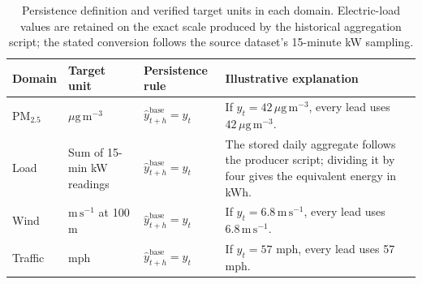 \begin{table}[htbp]
\centering
\footnotesize
\setlength{\tabcolsep}{4pt}
\renewcommand{\arraystretch}{1.18}
\begin{tabularx}{\textwidth}{@{}p{1.45cm} p{2.55cm} p{3.2cm} X@{}}
\toprule
\textbf{Domain} & \textbf{Target unit} & \textbf{Persistence rule} & \textbf{Illustrative explanation} \\
\midrule
PM$_{2.5}$ & $\mu\mathrm{g}\,\mathrm{m}^{-3}$ & $\hat y_{t+h}^{\mathrm{base}}=y_t$ & If $y_t=42\,\mu\mathrm{g}\,\mathrm{m}^{-3}$, every lead uses $42\,\mu\mathrm{g}\,\mathrm{m}^{-3}$. \\
Load & Sum of 15-min kW readings & $\hat y_{t+h}^{\mathrm{base}}=y_t$ & The stored daily aggregate follows the producer script; dividing it by four gives the equivalent energy in kWh. \\
Wind & $\mathrm{m}\,\mathrm{s}^{-1}$ at 100 m & $\hat y_{t+h}^{\mathrm{base}}=y_t$ & If $y_t=6.8\,\mathrm{m}\,\mathrm{s}^{-1}$, every lead uses $6.8\,\mathrm{m}\,\mathrm{s}^{-1}$. \\
Traffic & mph & $\hat y_{t+h}^{\mathrm{base}}=y_t$ & If $y_t=57$ mph, every lead uses 57 mph. \\
\bottomrule
\end{tabularx}
\caption{Persistence definition and verified target units in each domain. Electric-load values are retained on the exact scale produced by the historical aggregation script; the stated conversion follows the source dataset's 15-minute kW sampling.}
\label{tab:baseline_domains}
\end{table}
